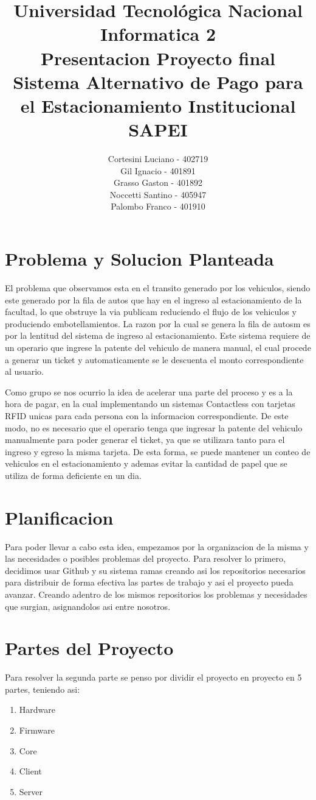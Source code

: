 \documentclass[12pt]{report}
\title{%
  \fontsize{25}{0}\selectfont Universidad Tecnológica Nacional \\
  \fontsize{22}{30}\selectfont Informatica 2 \\
  \fontsize{18}{25}\selectfont Presentacion Proyecto final\\
  \fontsize{18}{25}\selectfont Sistema Alternativo de Pago para el Estacionamiento Institucional\\
  \fontsize{18}{25}\selectfont SAPEI
}
\author{
Cortesini Luciano - 402719\\
Gil Ignacio - 401891\\
Grasso Gaston - 401892\\
Noccetti Santino - 405947 \\
Palombo Franco - 401910
}
\begin{document}
\maketitle
\section{Problema y Solucion Planteada}
 El problema que observamos esta en el transito generado por los vehiculos, siendo este generado por la fila de autos que hay en el ingreso al estacionamiento de la facultad, lo que obstruye la via publicam reduciendo el flujo de los vehiculos y produciendo embotellamientos. La razon por la cual se genera la fila de autosm es por la lentitud del sistema de ingreso al estacionamiento. Este sistema requiere de un operario que ingrese la patente del vehiculo de manera manual, el cual procede a generar un ticket y automaticamente se le descuenta el monto correspondiente al usuario.

Como grupo se nos ocurrio la idea de acelerar una parte del proceso y es a la hora de pagar, en la cual implementando un sistemas Contactless con tarjetas RFID unicas para cada persona con la informacion correspondiente. De este modo, no es necesario que el operario tenga que ingresar la patente del vehiculo manualmente para poder generar el ticket, ya que se utilizara tanto para el ingreso y egreso la misma tarjeta. De esta forma, se puede mantener un conteo de vehiculos en el estacionamiento y ademas evitar la cantidad de papel que se utiliza de forma deficiente en un dia.

\section{Planificacion}
 Para poder llevar a cabo esta idea, empezamos por la organizacion de la misma y las necesidades o posibles problemas del proyecto. Para resolver lo primero, decidimos usar Github y su sistema ramas creando asi los repositorios necesarios para distribuir de forma efectiva las partes de trabajo y asi el proyecto pueda avanzar. Creando adentro de los mismos repositorios los problemas y necesidades que surgian, asignandolos asi entre nosotros. 
\section{Partes del Proyecto}
 Para resolver la segunda parte se penso por dividir el proyecto en proyecto en 5 partes, teniendo asi:
 \begin{enumerate}
     \item Hardware
     \item Firmware
     \item Core
     \item Client
     \item Server
 \end{enumerate}
\newpage
\end{document}
